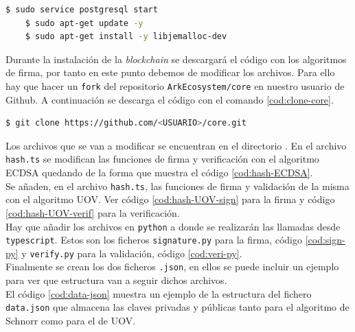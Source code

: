 \begin{lstlisting}[language=Bash,caption=Instalación \textit{blockchain}. Parte X, label=cod:start-sql, style=Consola]
	$ sudo service postgresql start
	$ sudo apt-get update -y 
	$ sudo apt-get install -y libjemalloc-dev
\end{lstlisting}

Durante la instalación de la \textit{blockchain} se descargará el código con los algoritmos de firma, por tanto en este punto debemos de modificar los archivos. Para ello hay que hacer un \texttt{fork} del repositorio \texttt{ArkEcosystem/core} \cite{ark-core} en nuestro usuario de Github. A continuación se descarga el código con el comando \ref{cod:clone-core}.\\

\begin{lstlisting}[language=Bash,caption=Clonar nuevo \textit{core}, label=cod:clone-core, style=Consola]
	$ git clone https://github.com/<USUARIO>/core.git
\end{lstlisting}

Los archivos que se van a modificar se encuentran en el directorio . En el archivo \texttt{hash.ts} se modifican las funciones de firma y verificación con el algoritmo ECDSA quedando de la forma que muestra el código \ref{cod:hash-ECDSA}.\\


Se añaden, en el archivo \texttt{hash.ts}, las funciones de firma y validación de la misma con el algoritmo UOV. Ver código \ref{cod:hash-UOV-sign} para la firma y código \ref{cod:hash-UOV-verif} para la verificación.\\



Hay que añadir los archivos en \texttt{python} a donde se realizarán las llamadas desde \texttt{typescript}. Estos son los ficheros \texttt{signature.py} para la firma, código \ref{cod:sign-py} y \texttt{verify.py} para la validación, código \ref{cod:veri-py}.\\




Finalmente se crean los dos ficheros \texttt{.json}, en ellos se puede incluir un ejemplo para ver que estructura van a seguir dichos archivos. \\

El código \ref{cod:data-json} muestra un ejemplo de la estructura del fichero \texttt{data.json} que almacena las claves privadas y públicas tanto para el algoritmo de Schnorr como para el de UOV.\\

